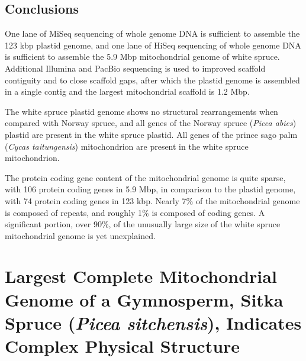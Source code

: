 \documentclass[
  12pt,
  oneside,
  openany]{book}
\begin{document}
\hypertarget{conclusions-3}{%
\section{Conclusions}\label{conclusions-3}}

One lane of MiSeq sequencing of whole genome DNA is sufficient to assemble the 123 kbp plastid genome, and one lane of HiSeq sequencing of whole genome DNA is sufficient to assemble the 5.9 Mbp mitochondrial genome of white spruce. Additional Illumina and PacBio sequencing is used to improved scaffold contiguity and to close scaffold gaps, after which the plastid genome is assembled in a single contig and the largest mitochondrial scaffold is 1.2 Mbp.

The white spruce plastid genome shows no structural rearrangements when compared with Norway spruce, and all genes of the Norway spruce (\emph{Picea abies}) plastid are present in the white spruce plastid. All genes of the prince sago palm (\emph{Cycas taitungensis}) mitochondrion are present in the white spruce mitochondrion.

The protein coding gene content of the mitochondrial genome is quite sparse, with 106 protein coding genes in 5.9 Mbp, in comparison to the plastid genome, with 74 protein coding genes in 123 kbp. Nearly 7\% of the mitochondrial genome is composed of repeats, and roughly 1\% is composed of coding genes. A significant portion, over 90\%, of the unusually large size of the white spruce mitochondrial genome is yet unexplained.

\hypertarget{largest-complete-mitochondrial-genome-of-a-gymnosperm-sitka-spruce-picea-sitchensis-indicates-complex-physical-structure}{%
\chapter{\texorpdfstring{Largest Complete Mitochondrial Genome of a Gymnosperm, Sitka Spruce (\emph{Picea sitchensis}), Indicates Complex Physical Structure}{Largest Complete Mitochondrial Genome of a Gymnosperm, Sitka Spruce (Picea sitchensis), Indicates Complex Physical Structure}}\label{largest-complete-mitochondrial-genome-of-a-gymnosperm-sitka-spruce-picea-sitchensis-indicates-complex-physical-structure}}

\end{document}
